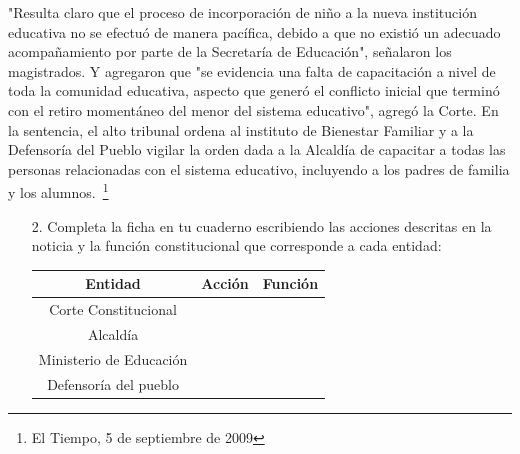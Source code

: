 \documentclass[10pt,twoside]{article}
\begin{document}
"Resulta claro que el proceso de incorporación de niño a la nueva institución
educativa no se efectuó de manera pacífica, debido a que no existió un adecuado acompañamiento por parte de la Secretaría de Educación", señalaron los magistrados. Y agregaron que "se evidencia una falta de capacitación a nivel de toda la comunidad educativa, aspecto que generó el conflicto inicial que terminó con el retiro momentáneo del menor del sistema educativo", agregó la Corte. En la sentencia, el alto tribunal ordena al instituto de Bienestar Familiar y a la Defensoría del Pueblo vigilar la orden dada a la Alcaldía de capacitar a todas las personas relacionadas con el sistema educativo, incluyendo a los padres de familia y los alumnos.~\footnote{El Tiempo, 5 de septiembre de 2009}
\begin{enumerate}
\item[2.] Completa la ficha en tu cuaderno escribiendo las acciones descritas en la noticia y la función constitucional que corresponde a cada entidad:
\begin{tabular}{|c|c|c|}
\hline 
\textbf{Entidad} & \textbf{Acción} & \textbf{Función} \\ 
\hline 
Corte Constitucional &  &  \\ 
\hline 
Alcaldía &  &  \\ 
\hline 
Ministerio de Educación &  &  \\ 
\hline 
Defensoría del pueblo &  &  \\ 
\hline 
\end{tabular} 
\end{enumerate}
\end{document}
